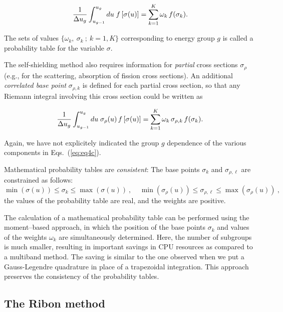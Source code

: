\begin{equation}
{1 \over
\Delta u_g}\int_{u_{g-1}}^{u_g} du \; f\left[ \sigma(u)\right]=\sum_{k=1}^{K}
\omega_k \, f(\sigma_k) .
\label{eq:eq4b}
\end{equation}

\vskip 0.1cm

The sets of values $\{ \omega_k, \ \sigma_k \ ; \ k=1,K \}$ corresponding to
energy group $g$ is called a probability table for the variable $\sigma$.

\vskip 0.1cm

The self-shielding method also requires information for {\sl partial} cross
sections $\sigma_\rho$ (e.g., for the scattering, absorption of fission cross
sections). An additional {\sl correlated base point} $\sigma_{\rho,k}$ is
defined for each partial cross section, so that any Riemann integral involving
this cross section could be written as

\begin{equation}
{1 \over \Delta u_g}\int_{u_{g-1}}^{u_g} du \; \sigma_\rho(u) \,
f\left[\sigma(u)\right]=\sum_{k=1}^{K} \omega_k \, \sigma_{\rho,k} \,
f(\sigma_k).
\label{eq:eq4c}
\end{equation}

\vskip 0.1cm

Again, we have not explicitely indicated the group $g$ dependence of the
various components in Eqs.~(\ref{eq:eq4c}).

\vskip 0.1cm

Mathematical probability tables are {\sl consistent}: The base points
$\sigma_k$ and $\sigma_{\rho,\ell}$ are constrained as follows:
$$\min(\sigma(u))\le\sigma_k\le\max(\sigma(u)) \ , \ \ \ \ \
\min(\sigma_\rho(u))\le\sigma_{\rho,\ell}\le\max(\sigma_\rho(u)) \ ,$$
the values of the probability table are real, and the weights are positive.

\vskip 0.1cm

The calculation of a mathematical probability table can be performed using the
moment--based approach, in which the position of the base points $\sigma_k$ and
values of the weights $\omega_k$ are simultaneously determined.
Here, the number of subgroups is much smaller, resulting in important savings
in CPU resources as compared to a multiband method. The saving is similar to
the one observed when we put a Gauss-Legendre quadrature in place of a
trapezoidal integration. This approach preserves the consistency of the
probability tables.

\subsection{The Ribon method}
\label{ssCALENR_Theory2}
\vskip 0.5cm

